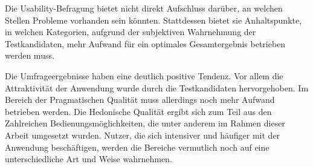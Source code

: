 Die Usability-Befragung bietet nicht direkt Aufschluss darüber, an welchen Stellen Probleme vorhanden sein könnten. Stattdessen bietet sie Anhaltspunkte, in welchen Kategorien, aufgrund der subjektiven Wahrnehmung der Testkandidaten, mehr Aufwand für ein optimales Gesamtergebnis betrieben werden muss.\par
{}
Die Umfrageergebnisse haben eine deutlich positive Tendenz. Vor allem die Attraktivität der Anwendung wurde durch die Testkandidaten hervorgehoben. Im Bereich der Pragmatischen Qualität muss allerdings noch mehr Aufwand betrieben werden. Die Hedonische Qualität ergibt sich zum Teil aus den Zahlreichen Bedienungsmöglichkeiten, die unter anderem im Rahmen dieser Arbeit umgesetzt wurden. Nutzer, die sich intensiver und häufiger mit der Anwendung beschäftigen, werden die Bereiche vermutlich noch auf eine unterschiedliche Art und Weise wahrnehmen.\par
{}
